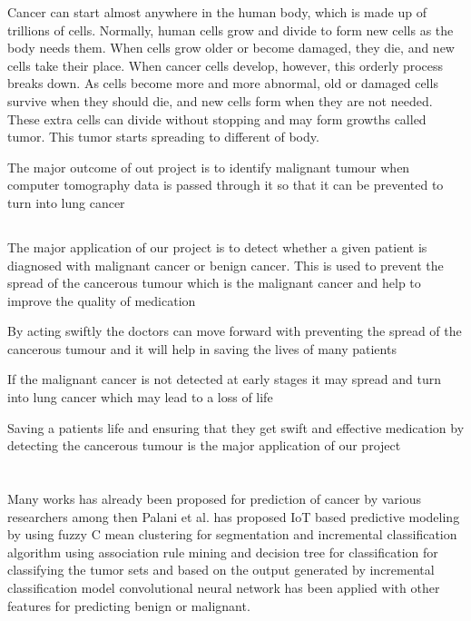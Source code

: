 \documentclass[12pt]{article}
\newcommand{\mainsize}{\fontsize{16pt}{12pt}\selectfont}
\newcommand{\msize}{\fontsize{14pt}{12pt}\selectfont}
\begin{document}
Cancer can start almost anywhere in the human body, which is made up of trillions of cells. Normally, human cells grow and divide to form new cells as the body needs them. When cells grow older or become damaged, they die, and new cells take their place. When cancer cells develop, however, this orderly process breaks down. As cells become more and more abnormal, old or damaged cells survive when they should die, and new cells form when they are not needed. These extra cells can divide without stopping and may form growths called tumor. This tumor starts spreading to different of body.

The major outcome of out project is to identify malignant tumour when computer tomography data is passed through it so that it can be prevented to turn into lung cancer 

\newpage
\subsection{\msize{\textbf{APPLICATIONS}}}
The major application of our project is to detect whether a given patient is diagnosed with malignant cancer or benign cancer. 
This is used to prevent the spread of the cancerous tumour which is the malignant cancer and help to improve the quality of medication

By acting swiftly the doctors can move forward with preventing the spread of the cancerous tumour and it will help in saving the lives of many patients 

If the malignant cancer is not detected at early stages it may spread and turn into lung cancer which may lead to a loss of life 

Saving a patients life and ensuring that they get swift and effective medication by detecting the cancerous tumour is the major application of our project 
\newpage
\section{\mainsize{\textbf{LITERATURE SURVEY}}}

Many works has already been proposed for prediction of cancer by various researchers among then Palani et al. has proposed IoT based predictive modeling by using fuzzy C mean clustering for segmentation and incremental classification algorithm using association rule mining and decision tree for classification for classifying the tumor sets and based on the output generated by incremental classification model convolutional neural network has been applied with other features for predicting benign or malignant.
\newpage
\end{document}
